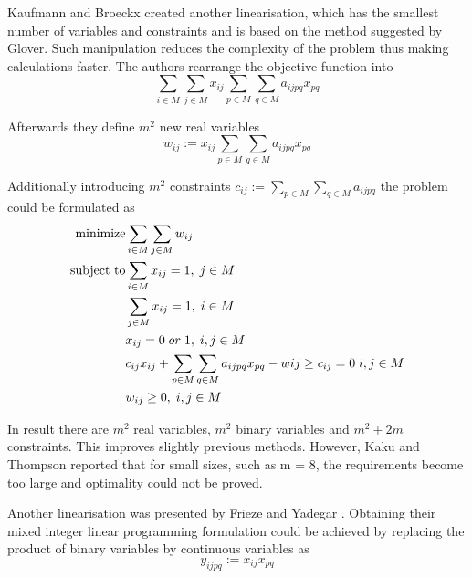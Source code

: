 Kaufmann and Broeckx \cite{kaufman1978algorithm} created another linearisation, which has the smallest number of variables and constraints and is based on the method suggested by Glover.
Such manipulation reduces the complexity of the problem thus making calculations faster.
The authors rearrange the objective function into
\begin{equation}
  \sum_{i \in M} \sum_{j \in M} x_{ij} \sum_{p \in M} \sum_{q \in M} a_{ijpq} x_{pq}
\end{equation}

Afterwards they define $m^2$ new real variables
\begin{equation}
  w_{ij} := x_{ij}\sum_{p \in M} \sum_{q \in M} a_{ijpq} x_{pq}
\end{equation}

Additionally introducing $m^2$ constraints $ c_{ij} := \sum_{p \in M} \sum_{q \in M} a_{ijpq} $ the problem could be formulated as
\begin{align}
  \text{minimize} &\null \sum_{i \in M} \sum_{j \in M} w_{ij}\\
  \text{subject to} &\null \sum_{i \in M} x_{ij} = 1, \; j \in M \\
  &\null \sum_{j \in M} x_{ij} = 1, \; i \in M \\
  &\null x_{ij} = 0 \; or \; 1, \; i, j \in M \\
  &\null c_{ij}x_{ij} + \sum_{p \in M} \sum_{q \in M} a_{ijpq}x_{pq} - w{ij} \geq c_{ij} = 0 \; i, j \in M \\
  &\null w_{ij} \geq 0, \; i, j \in M \\
\end{align}

In result there are $m^2$ real variables, $m^2$ binary variables and $m^2 + 2m$ constraints.
This improves slightly previous methods.
However, Kaku and Thompson \cite{kaku1986exact} reported that for small sizes, such as m = 8, the requirements become too large and optimality could not be proved.

Another linearisation was presented by Frieze and Yadegar \cite{frieze1983quadratic}.
Obtaining their mixed integer linear programming formulation could be achieved by replacing the product of binary variables by continuous variables as
\begin{equation}
  y_{ijpq} := x_{ij} x_{pq}
\end{equation}

